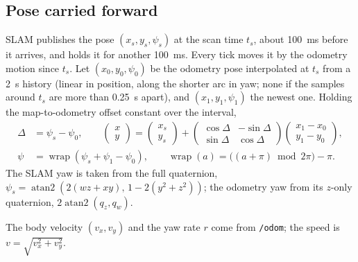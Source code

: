 \documentclass[11pt,a4paper]{article}
\newcommand{\wrap}{\operatorname{wrap}}
\begin{document}
\subsection{Pose carried forward}
SLAM publishes the pose $(x_s, y_s, \psi_s)$ at the scan time $t_s$, about
\SI{100}{\milli\second} before it arrives, and holds it for another
\SI{100}{\milli\second}. Every tick moves it by the odometry motion since $t_s$. Let
$(x_0,y_0,\psi_0)$ be the odometry pose interpolated at $t_s$ from a \SI{2}{\second}
history (linear in position, along the shorter arc in yaw; none if the samples around
$t_s$ are more than \SI{0.25}{\second} apart), and $(x_1,y_1,\psi_1)$ the newest one.
Holding the map-to-odometry offset constant over the interval,
\begin{equation}
\begin{aligned}
\Delta &= \psi_s - \psi_0, \qquad
\begin{pmatrix} x \\ y \end{pmatrix} =
\begin{pmatrix} x_s \\ y_s \end{pmatrix} +
\begin{pmatrix} \cos\Delta & -\sin\Delta \\ \sin\Delta & \cos\Delta \end{pmatrix}
\begin{pmatrix} x_1 - x_0 \\ y_1 - y_0 \end{pmatrix}, \\
\psi &= \wrap\!\left(\psi_s + \psi_1 - \psi_0\right), \qquad
\wrap(a) = \big((a+\pi) \bmod 2\pi\big) - \pi .
\end{aligned}
\label{eq:project}
\end{equation}
The SLAM yaw is taken from the full quaternion, $\psi_s =
\operatorname{atan2}(2(wz+xy),\, 1-2(y^2+z^2))$; the odometry yaw from its $z$-only
quaternion, $2\operatorname{atan2}(q_z, q_w)$.

The body velocity $(v_x, v_y)$ and the yaw rate $r$ come from \texttt{/odom}; the speed is
$v = \sqrt{v_x^2+v_y^2}$.
\end{document}
